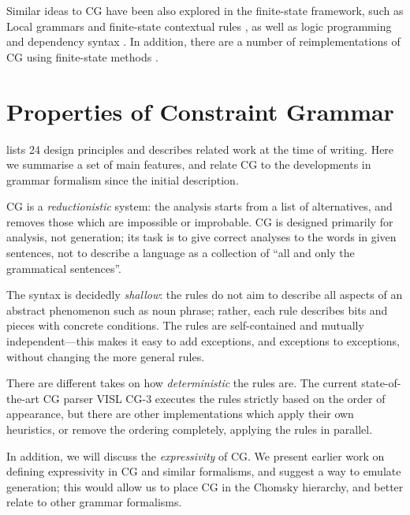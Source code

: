 Similar ideas to CG have been also explored in the finite-state framework, such as Local grammars \cite{gross1997local} and finite-state contextual rules \cite{grana2003fst}, as well as logic programming \cite{oflazer97votingconstraints,lager98} and dependency syntax \cite{tapanainen97fdg}.
 In addition, there are a number of reimplementations of CG using finite-state methods \cite{ylijyra2011cg_engine,hulden2011cg_engine,peltonen2011}. 




\section{Properties of Constraint Grammar}\label{sec:properties}

\cite{karlsson1995constraint} lists 24 design principles and describes
related work at the time of writing.
Here we summarise a set of main features, and relate CG to the developments in grammar formalism since the initial description.

CG is a \emph{reductionistic} system: the analysis starts from a list of alternatives,
and removes those which are impossible or improbable.
CG is designed primarily for analysis, not generation; its task is 
to give correct analyses to the words in given sentences,
not to describe a language as a collection of ``all and only the grammatical sentences''.

The syntax is decidedly \emph{shallow}: the rules do not aim to
describe all aspects of an abstract phenomenon such as noun phrase; 
rather, each rule describes bits and pieces with concrete conditions.
The rules are self-contained and mutually independent---this makes it 
easy to add exceptions, and exceptions to exceptions, without 
changing the more general rules.

There are different takes on how \emph{deterministic} the rules are.
The current state-of-the-art CG parser VISL CG-3 executes the rules strictly 
based on the order of appearance, but there are other implementations which 
apply their own heuristics, or remove the ordering completely, 
applying the rules in parallel. %

In addition, we will discuss the \emph{expressivity} of CG. 
We present earlier work on defining expressivity in CG and similar formalisms,
and suggest a way to emulate generation; this would allow us to place CG in the Chomsky hierarchy, and better relate to other grammar formalisms.

